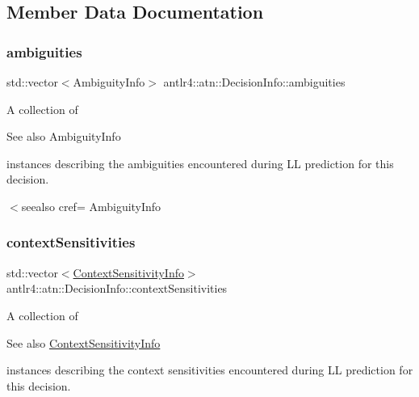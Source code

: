 \subsection{Member Data Documentation}
\mbox{\label{classantlr4_1_1atn_1_1DecisionInfo_a63842cdb1628b1e6ff45ae2c8d4a68d8}} 
\subsubsection{\texorpdfstring{ambiguities}{ambiguities}}
{\footnotesize\ttfamily std\+::vector$<$Ambiguity\+Info$>$ antlr4\+::atn\+::\+Decision\+Info\+::ambiguities}



A collection of \begin{DoxySeeAlso}{See also}
Ambiguity\+Info


\end{DoxySeeAlso}
instances describing the ambiguities encountered during LL prediction for this decision. 

$<$seealso cref= Ambiguity\+Info \mbox{\label{classantlr4_1_1atn_1_1DecisionInfo_a607bcd881761a0c502f3511d840c1c16}} 
\subsubsection{\texorpdfstring{context\+Sensitivities}{contextSensitivities}}
{\footnotesize\ttfamily std\+::vector$<$\hyperlink{classantlr4_1_1atn_1_1ContextSensitivityInfo}{Context\+Sensitivity\+Info}$>$ antlr4\+::atn\+::\+Decision\+Info\+::context\+Sensitivities}



A collection of \begin{DoxySeeAlso}{See also}
\hyperlink{classantlr4_1_1atn_1_1ContextSensitivityInfo}{Context\+Sensitivity\+Info}


\end{DoxySeeAlso}
instances describing the context sensitivities encountered during LL prediction for this decision. 

